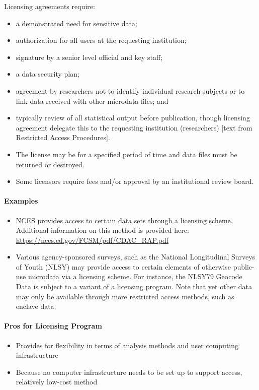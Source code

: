 Licensing agreements require:
\begin{itemize}
\item a demonstrated need for sensitive data;
\item authorization for all users at the requesting institution;
\item signature by a senior level official and key staff;
\item a data security plan;
\item agreement by researchers not to identify individual research subjects or to link data received with other microdata files; and
\item typically review of all statistical output before publication, though licensing agreement delegate this to the requesting institution (researchers)
[text from Restricted Access Procedures].
\item 
The license may be for a specified period of time and data files must be returned or destroyed. 
\item Some licensors require fees and/or approval by an institutional review board. 
\end{itemize}

\paragraph{Examples}
\begin{itemize}
    \item NCES provides access to certain data sets through a licensing scheme. Additional information on this method is provided here: \url{https://nces.ed.gov/FCSM/pdf/CDAC\_RAP.pdf}
    \item Various agency-sponsored surveys, such as the National Longitudinal Surveys of Youth (NLSY) may provide access to certain elements of otherwise public-use microdata via a licensing scheme. For instance, the NLSY79 Geocode Data is subject to a \href{https://www.bls.gov/nls/questions-and-answers.htm#anch25}{variant of a licensing program}. Note that yet other data may only be available through more restricted access methods, such as enclave data.
\end{itemize}

\paragraph{Pros for Licensing Program}
\begin{itemize}
    \item Provides for flexibility in terms of analysis methods and user computing infrastructure
    \item Because no computer infrastructure needs to be set up to support access, relatively low-cost method
\end{itemize}

